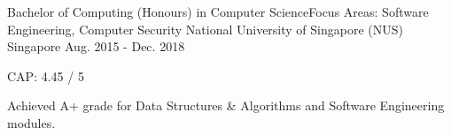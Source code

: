 

\begin{cventries}

  \cventry
    {Bachelor of Computing (Honours) in Computer Science\linebreak Focus Areas: Software Engineering, Computer Security} %
    {National University of Singapore (NUS)} %
    {Singapore} %
    {Aug. 2015 - Dec. 2018} %
    {
      \begin{cvitems} %
        \item {CAP: 4.45 / 5}
        \item {Achieved A+ grade for Data Structures \& Algorithms and Software Engineering modules.}
      \end{cvitems}
    }

\end{cventries}
